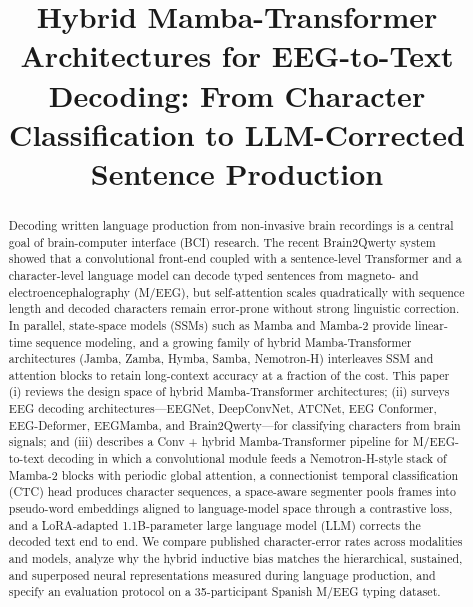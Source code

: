 \documentclass[conference]{IEEEtran}
\begin{document}
\title{Hybrid Mamba-Transformer Architectures for EEG-to-Text Decoding:
From Character Classification to LLM-Corrected Sentence Production}

\author{
}

\maketitle

\begin{abstract}
Decoding written language production from non-invasive brain recordings is a
central goal of brain-computer interface (BCI) research. The recent
Brain2Qwerty system showed that a convolutional front-end coupled with a
sentence-level Transformer and a character-level language model can decode
typed sentences from magneto- and electroencephalography (M/EEG), but
self-attention scales quadratically with sequence length and decoded
characters remain error-prone without strong linguistic correction. In
parallel, state-space models (SSMs) such as Mamba and Mamba-2 provide
linear-time sequence modeling, and a growing family of hybrid
Mamba-Transformer architectures (Jamba, Zamba, Hymba, Samba, Nemotron-H)
interleaves SSM and attention blocks to retain long-context accuracy at a
fraction of the cost. This paper (i) reviews the design space of hybrid
Mamba-Transformer architectures; (ii) surveys EEG decoding
architectures---EEGNet, DeepConvNet, ATCNet, EEG Conformer, EEG-Deformer,
EEGMamba, and Brain2Qwerty---for classifying characters from brain signals;
and (iii) describes a Conv + hybrid Mamba-Transformer pipeline for
M/EEG-to-text decoding in which a convolutional module feeds a
Nemotron-H-style stack of Mamba-2 blocks with periodic global attention, a
connectionist temporal classification (CTC) head produces character
sequences, a space-aware segmenter pools frames into pseudo-word embeddings
aligned to language-model space through a contrastive loss, and a
LoRA-adapted 1.1B-parameter large language model (LLM) corrects the decoded
text end to end. We compare published character-error rates across
modalities and models, analyze why the hybrid inductive bias matches the
hierarchical, sustained, and superposed neural representations measured
during language production, and specify an evaluation protocol on a
35-participant Spanish M/EEG typing dataset.
\end{abstract}
\end{document}
